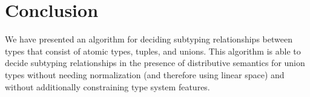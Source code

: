 \documentclass[a4paper,english]{lipics-v2019}
\begin{document}
\section{Conclusion}

We have presented an algorithm for deciding subtyping relationships between
types that consist of atomic types, tuples, and unions. This algorithm is able
to decide subtyping relationships in the presence of distributive semantics
for union types without needing normalization (and therefore using linear
space) and without additionally constraining type system features.

%

\end{document}
